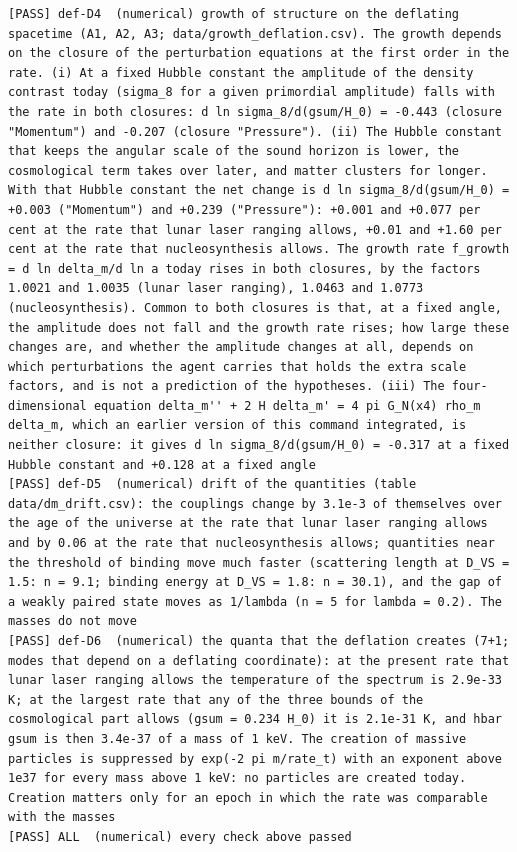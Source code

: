 \documentclass[
  10pt,
]{article}
\begin{document}
\begin{verbatim}
[PASS] def-D4  (numerical) growth of structure on the deflating spacetime (A1, A2, A3; data/growth_deflation.csv). The growth depends on the closure of the perturbation equations at the first order in the rate. (i) At a fixed Hubble constant the amplitude of the density contrast today (sigma_8 for a given primordial amplitude) falls with the rate in both closures: d ln sigma_8/d(gsum/H_0) = -0.443 (closure "Momentum") and -0.207 (closure "Pressure"). (ii) The Hubble constant that keeps the angular scale of the sound horizon is lower, the cosmological term takes over later, and matter clusters for longer. With that Hubble constant the net change is d ln sigma_8/d(gsum/H_0) = +0.003 ("Momentum") and +0.239 ("Pressure"): +0.001 and +0.077 per cent at the rate that lunar laser ranging allows, +0.01 and +1.60 per cent at the rate that nucleosynthesis allows. The growth rate f_growth = d ln delta_m/d ln a today rises in both closures, by the factors 1.0021 and 1.0035 (lunar laser ranging), 1.0463 and 1.0773 (nucleosynthesis). Common to both closures is that, at a fixed angle, the amplitude does not fall and the growth rate rises; how large these changes are, and whether the amplitude changes at all, depends on which perturbations the agent carries that holds the extra scale factors, and is not a prediction of the hypotheses. (iii) The four-dimensional equation delta_m'' + 2 H delta_m' = 4 pi G_N(x4) rho_m delta_m, which an earlier version of this command integrated, is neither closure: it gives d ln sigma_8/d(gsum/H_0) = -0.317 at a fixed Hubble constant and +0.128 at a fixed angle
[PASS] def-D5  (numerical) drift of the quantities (table data/dm_drift.csv): the couplings change by 3.1e-3 of themselves over the age of the universe at the rate that lunar laser ranging allows and by 0.06 at the rate that nucleosynthesis allows; quantities near the threshold of binding move much faster (scattering length at D_VS = 1.5: n = 9.1; binding energy at D_VS = 1.8: n = 30.1), and the gap of a weakly paired state moves as 1/lambda (n = 5 for lambda = 0.2). The masses do not move
[PASS] def-D6  (numerical) the quanta that the deflation creates (7+1; modes that depend on a deflating coordinate): at the present rate that lunar laser ranging allows the temperature of the spectrum is 2.9e-33 K; at the largest rate that any of the three bounds of the cosmological part allows (gsum = 0.234 H_0) it is 2.1e-31 K, and hbar gsum is then 3.4e-37 of a mass of 1 keV. The creation of massive particles is suppressed by exp(-2 pi m/rate_t) with an exponent above 1e37 for every mass above 1 keV: no particles are created today. Creation matters only for an epoch in which the rate was comparable with the masses
[PASS] ALL  (numerical) every check above passed
\end{verbatim}
\end{document}
